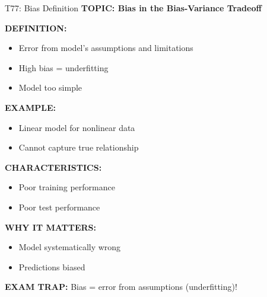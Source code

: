 \documentclass[8pt]{beamer}
\begin{document}
	\begin{frame}{T77: Bias Definition}
		\fontsize{6.5}{7.5}\selectfont
		\textbf{TOPIC: Bias in the Bias-Variance Tradeoff}
		
		\vspace{0.1cm}
		\textbf{DEFINITION:}
		\begin{itemize}
			\item Error from model's assumptions and limitations
			\item High bias = underfitting
			\item Model too simple
		\end{itemize}
		
		\vspace{0.1cm}
		\textbf{EXAMPLE:}
		\begin{itemize}
			\item Linear model for nonlinear data
			\item Cannot capture true relationship
		\end{itemize}
		
		\vspace{0.1cm}
		\textbf{CHARACTERISTICS:}
		\begin{itemize}
			\item Poor training performance
			\item Poor test performance
		\end{itemize}
		
		\vspace{0.1cm}
		\textbf{WHY IT MATTERS:}
		\begin{itemize}
			\item Model systematically wrong
			\item Predictions biased
		\end{itemize}
		
		\textcolor{myred}{\textbf{EXAM TRAP:}} Bias = \textcolor{myblue}{error from assumptions} (underfitting)!
	\end{frame}
	
\end{document}
